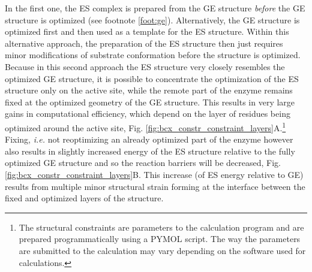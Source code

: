 In the first one, the ES complex is prepared from the GE structure \textit{before} the GE structure is optimized (see footnote \ref{foot:ge}).
Alternatively, the GE structure is optimized first and then used as a template for the ES structure.
Within this alternative approach, the preparation of the ES structure then just requires minor modifications of substrate conformation before the structure is optimized.\\
Because in this second approach the ES structure very closely resembles the optimized GE structure, it is possible to concentrate the optimization of the ES structure only on the active site, while the remote part of the enzyme remains fixed at the optimized geometry of the GE structure.
This results in very large gains in computational efficiency, which depend on the layer of residues being optimized around the active site, Fig. \ref{fig:bcx_constr_constraint_layers}A.\footnote{The structural constraints are parameters to the calculation program and are prepared programmatically using a PYMOL script. The way the parameters are submitted to the calculation may vary depending on the software used for calculations.}
Fixing, \textit{i.e.} not reoptimizing an already optimized part of the enzyme however also results in slightly increased energy of the ES structure relative to the fully optimized GE structure and so the reaction barriers will be decreased, Fig. \ref{fig:bcx_constr_constraint_layers}B.
This increase (of ES energy relative to GE) results from multiple minor structural strain forming at the interface between the fixed and optimized layers of the structure.
